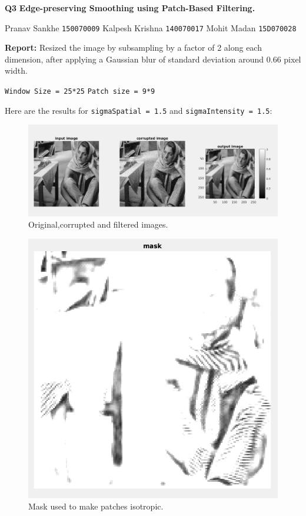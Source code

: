 \documentclass{article}
\begin{document}
\textbf{Q3}  
\textbf{Edge-preserving Smoothing using Patch-Based Filtering.}
\vskip 0.2in

Pranav Sankhe \texttt{150070009} \newline
Kalpesh Krishna \texttt{140070017}  \newline
Mohit Madan \texttt{15D070028} \newline

\vskip 0.5in

\textbf{Report:}  
\vskip 0.1in
Resized the image by subsampling by a factor of 2 along each dimension, after applying a Gaussian blur of standard deviation around 0.66 pixel width. \newline

\texttt{Window Size = 25*25}   \newline
\texttt{Patch size = 9*9}  \newline

Here are the results for \texttt{sigmaSpatial = 1.5} and \texttt{sigmaIntensity = 1.5}: 

\begin{figure}[h!]
  \includegraphics[width=\linewidth]{result.png}
  \caption{Original,corrupted and filtered images.}
  \label{fig:result1}
\end{figure}


\begin{figure}[h!]
  \includegraphics[width=\linewidth]{mask.png}
  \caption{Mask used to make patches isotropic.}
  \label{fig:result2}
\end{figure}
\end{document}

